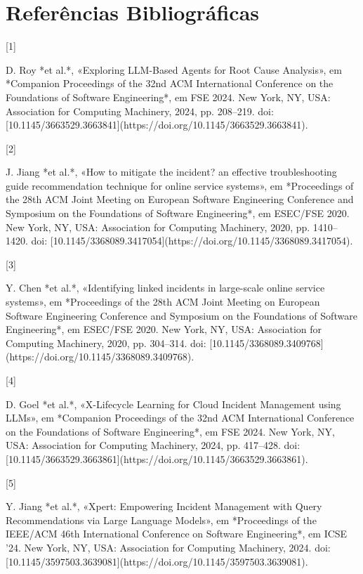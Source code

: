 \section{Referências Bibliográficas}

[1]

D. Roy *et al.*, «Exploring LLM-Based Agents for Root Cause Analysis», em *Companion Proceedings of the 32nd ACM International Conference on the Foundations of Software Engineering*, em FSE 2024. New York, NY, USA: Association for Computing Machinery, 2024, pp. 208–219. doi: [10.1145/3663529.3663841](https://doi.org/10.1145/3663529.3663841).

[2]

J. Jiang *et al.*, «How to mitigate the incident? an effective troubleshooting guide recommendation technique for online service systems», em *Proceedings of the 28th ACM Joint Meeting on European Software Engineering Conference and Symposium on the Foundations of Software Engineering*, em ESEC/FSE 2020. New York, NY, USA: Association for Computing Machinery, 2020, pp. 1410–1420. doi: [10.1145/3368089.3417054](https://doi.org/10.1145/3368089.3417054).

[3]

Y. Chen *et al.*, «Identifying linked incidents in large-scale online service systems», em *Proceedings of the 28th ACM Joint Meeting on European Software Engineering Conference and Symposium on the Foundations of Software Engineering*, em ESEC/FSE 2020. New York, NY, USA: Association for Computing Machinery, 2020, pp. 304–314. doi: [10.1145/3368089.3409768](https://doi.org/10.1145/3368089.3409768).

[4]

D. Goel *et al.*, «X-Lifecycle Learning for Cloud Incident Management using LLMs», em *Companion Proceedings of the 32nd ACM International Conference on the Foundations of Software Engineering*, em FSE 2024. New York, NY, USA: Association for Computing Machinery, 2024, pp. 417–428. doi: [10.1145/3663529.3663861](https://doi.org/10.1145/3663529.3663861).

[5]

Y. Jiang *et al.*, «Xpert: Empowering Incident Management with Query Recommendations via Large Language Models», em *Proceedings of the IEEE/ACM 46th International Conference on Software Engineering*, em ICSE ’24. New York, NY, USA: Association for Computing Machinery, 2024. doi: [10.1145/3597503.3639081](https://doi.org/10.1145/3597503.3639081).
